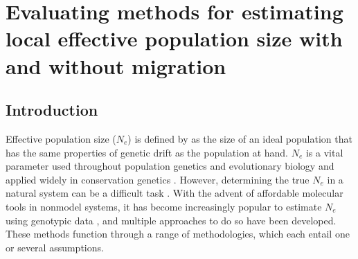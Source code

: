 \chapter{Evaluating methods for estimating local effective population size with and without migration}
\label{chap:effectivepopsize}



\section{Introduction}
Effective population size ($N_e$) is defined by \citet{Wright:1931} as the size of 
an ideal population that has the same properties of genetic drift as the population at hand. 
$N_e$ is a vital parameter used throughout population genetics and evolutionary 
biology and applied widely in conservation genetics \citep{Schwartz:2007, Dudgeon:2012}. 
However, determining the true $N_e$ in a natural system can be a difficult task 
\citep{Serbezov:2012, Theunert:2012}. With the advent of affordable molecular tools 
in nonmodel systems, it has become increasingly popular to estimate $N_e$ using genotypic 
data \citep{Wang:2005, Palstra:2012}, and multiple approaches to do so have been developed. 
These methods function through a range of methodologies, which each entail one or several assumptions.

